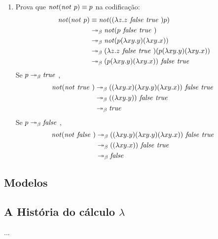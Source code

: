 \documentclass[../main.tex]{subfiles}
\begin{document}
\begin{enumerate}
    \item Prova que $\text{\emph{not}}(\text{\emph{not }} p)\equiv p$ na codificação:
    \begin{equation*}
        \begin{split}
            \text{\emph{not}}(\text{\emph{not }} p) & \equiv \text{\emph{not}}((\lambda z . z \text{\emph{ false }} \text{\emph{true }}) p)
                                   \\ & \twoheadrightarrow_{\beta} \text{\emph{not}}(p \text{\emph{ false }} \text{\emph{true }})
                                   \\ & \twoheadrightarrow_{\beta} \text{\emph{not}}(p (\lambda xy . y) (\lambda xy . x))
                                   \\ & \twoheadrightarrow_{\beta} (\lambda z . z \text{\emph{ false }} \text{\emph{true }})(p (\lambda xy . y) (\lambda xy . x))
                                   \\ & \twoheadrightarrow_{\beta} (p (\lambda xy . y) (\lambda xy . x)) \text{\emph{ false }} \text{\emph{true }}
        \end{split}
    \end{equation*}
    Se $p \twoheadrightarrow_{\beta} \text{\emph{true }}$,
    \begin{equation*}
        \begin{split}
            \text{\emph{not}}(\text{\emph{not }} \text{\emph{true }}) & \twoheadrightarrow_{\beta} ((\lambda xy . x) (\lambda xy . y) (\lambda xy . x)) \text{\emph{ false }} \text{\emph{true }} \\ & \twoheadrightarrow_{\beta} ((\lambda xy . y)) \text{\emph{ false }} \text{\emph{true }} \\ & \twoheadrightarrow_{\beta} \text{\emph{true }}
        \end{split}
    \end{equation*}
    Se $p \twoheadrightarrow_{\beta} \text{\emph{false }}$,
    \begin{equation*}
        \begin{split}
            \text{\emph{not}}(\text{\emph{not }} \text{\emph{false }}) & \twoheadrightarrow_{\beta} ((\lambda xy . y) (\lambda xy . y) (\lambda xy . x)) \text{\emph{ false }} \text{\emph{true }} \\ & \twoheadrightarrow_{\beta} ((\lambda xy . x)) \text{\emph{ false }} \text{\emph{true }} \\ & \twoheadrightarrow_{\beta} \text{\emph{false }}
        \end{split}
    \end{equation*}
\end{enumerate}

\subsection{Modelos}

\subsection[A História do Cálculo Lambda]{A História do cálculo $\lambda$}
...
\end{document}
